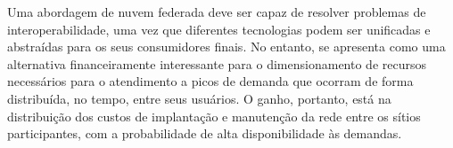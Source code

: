 \documentclass[tese,capa]{texufpel}
\begin{document}
Uma abordagem de nuvem federada deve ser capaz de resolver problemas de interoperabilidade, uma vez que diferentes tecnologias podem ser unificadas e abstraídas para os seus consumidores finais. No entanto, se apresenta como uma alternativa financeiramente interessante para o dimensionamento de recursos necessários para o atendimento a picos de demanda que ocorram de forma distribuída, no tempo, entre seus usuários. O ganho, portanto, está na distribuição dos custos de implantação e manutenção da rede entre os sítios participantes, com a probabilidade de alta disponibilidade às demandas.



\end{document}
